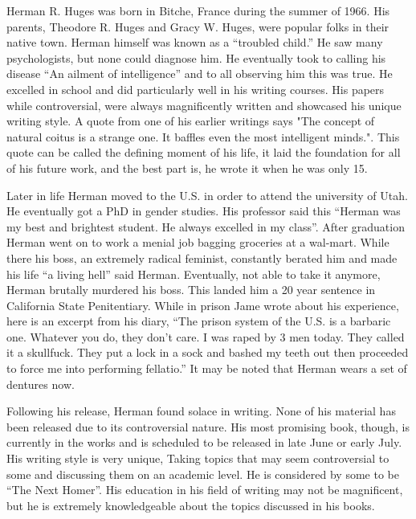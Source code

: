 Herman R. Huges was born in Bitche, France during the summer of 1966. His
parents, Theodore R. Huges and Gracy W. Huges, were popular folks in their
native town. Herman himself was known as a “troubled child.” He saw many psychologists,
but none could diagnose him. He eventually took to calling his disease “An ailment of
intelligence” and to all observing him this was true. He excelled in school and
did particularly well in his writing courses. His papers while controversial,
were always magnificently written and showcased his unique writing style. A
quote from one of his earlier writings says "The concept of natural coitus is a
strange one. It baffles even the most intelligent minds.". This quote can be
called the defining moment of his life, it laid the foundation for all of his
future work, and the best part is, he wrote it when he was only 15.


       Later in life Herman moved to the U.S. in order to attend the university
of Utah. He eventually got a PhD in gender studies. His professor said this
“Herman was my best and brightest student. He always excelled in my class”. After
graduation Herman went on to work a menial job bagging groceries at a wal-mart.
While there his boss, an extremely radical feminist, constantly berated him and
made his life “a living hell” said Herman. Eventually, not able to take it
anymore, Herman brutally murdered his boss. This landed him a 20 year sentence in
California State Penitentiary. While in prison Jame wrote about his experience,
here is an excerpt from his diary, “The prison system of the U.S. is a barbaric
one. Whatever you do, they don't care. I was raped by 3 men today. They called
it a skullfuck. They put a lock in a sock and bashed my teeth out then proceeded
to force me into performing fellatio.” It may be noted that Herman wears a set
of dentures now.


       Following his release, Herman found solace in writing. None of his
material has been released due to its controversial nature. His most promising
book, though, is currently in the works and is scheduled to be released in late
June or early July. His writing style is very unique, Taking topics that may
seem controversial to some and discussing them on an academic level. He is
considered by some to be “The Next Homer”. His education in his field of writing
may not be magnificent, but he is extremely knowledgeable about the topics
discussed in his books.